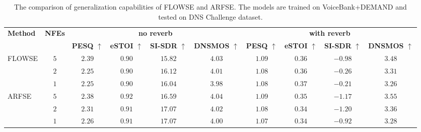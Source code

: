 \documentclass[cameraready]{Interspeech}
\begin{document}
\begin{table}[t]
\centering
\caption{The comparison of generalization capabilities of FLOWSE and ARFSE. The models are trained on VoiceBank+DEMAND and tested on DNS Challenge dataset.}
\label{tab:generalization_ablation}
\footnotesize
\setlength{\tabcolsep}{7pt}
\renewcommand\arraystretch{1.1}
\begin{tabular}{l c c c c c c c c c }
\toprule
\multirow{2}{*}{\textbf{Method}} & \multirow{2}{*}{\textbf{NFEs}} & \multicolumn{4}{c}{\textbf{no reverb}} & \multicolumn{4}{c}{\textbf{with reverb}} \\
\cmidrule(lr){3-6} \cmidrule(lr){7-10}
& \textbf{} & \textbf{PESQ} $\uparrow$ & \textbf{eSTOI} $\uparrow$ & \textbf{SI-SDR} $\uparrow$ & \textbf{DNSMOS} $\uparrow$ & \textbf{PESQ} $\uparrow$ & \textbf{eSTOI} $\uparrow$ & \textbf{SI-SDR} $\uparrow$ & \textbf{DNSMOS} $\uparrow$ \\
\midrule
\multirow{3}{*}{FLOWSE}
& $5$ & \underline{$\mathbf{2.39}$} & $0.90$ & $15.82$ & \underline{$4.03$} & \underline{$\mathbf{1.09}$} & $0.36$ & $-0.98$ & \underline{$3.48$} \\
& $2$ & $2.25$ & $0.90$ & \underline{$16.12$} & $4.01$ & $1.08$ & $0.36$ & $-0.26$ & $3.31$ \\
& $1$ & $2.25$ & $0.90$ & $16.04$ & $3.98$ & $1.08$ & \underline{$\mathbf{0.37}$} & \underline{$\mathbf{-0.21}$} & $3.26$ \\
\midrule
\multirow{3}{*}{ARFSE}
& $5$ & \underline{$2.38$} & \underline{$\mathbf{0.92}$} & $16.59$ & \underline{$\mathbf{4.04}$} & \underline{$\mathbf{1.09}$} & \underline{$0.35$} & $-1.17$  & \underline{$\mathbf{3.55}$} \\
& $2$ & $2.31$ & $0.91$ & $17.07$ & $4.02$ & $1.08$ & $0.34$ & $-1.20$ & $3.36$ \\
& $1$ & $2.26$ & $0.91$ & \underline{$\mathbf{17.07}$} & $4.00$ & $1.07$ & $0.34$ & \underline{$-0.92$} & $3.28$ \\
\bottomrule
\end{tabular}
\vspace{-8pt}
\end{table}
\end{document}
